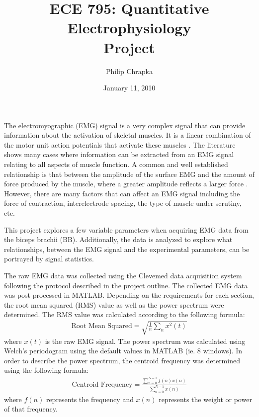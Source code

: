 \documentclass[11pt]{article}
\numberwithin{equation}{section}	%
\begin{document}
         
\title{ECE 795: Quantitative Electrophysiology\\Project}
\author{Philip Chrapka}
\date{January 11, 2010}
\maketitle

The electromyographic (EMG) signal is a very complex signal that can provide information about the activation of skeletal muscles. It is a linear combination of the motor unit action potentials that activate these muscles \cite{Beck2005,Jaskolska2006}. The literature shows many cases where information can be extracted from an EMG signal relating to all aspects of muscle function. A common and well established relationship is that between the amplitude of the surface EMG and the amount of force produced by the muscle, where a greater amplitude reflects a larger force \cite{Beck2005}. However, there are many factors that can affect an EMG signal including the force of contraction, interelectrode spacing, the type of muscle under scrutiny, etc.

This project explores a few variable parameters when acquiring EMG data from the biceps brachii (BB). Additionally, the data is analyzed to explore what relationships, between the EMG signal and the experimental parameters, can be portrayed by signal statistics.

The raw EMG data was collected using the Clevemed data acquisition system following the protocol described in the project outline. The collected EMG data was post processed in MATLAB. Depending on the requirements for each section, the root mean squared (RMS) value as well as the power spectrum were determined. The RMS value was calculated according to the following formula:
\begin{gather}
\textrm{Root Mean Squared} = \sqrt{\frac{1}{n}\sum_n{x^2(t)}} \nonumber
\end{gather}
where \(x(t)\) is the raw EMG signal. The power spectrum was calculated using Welch's periodogram using the default values in MATLAB (ie. 8 windows). In order to describe the power spectrum, the centroid frequency was determined using the following formula:
\begin{gather}
\textrm{Centroid Frequency} = \frac{\sum_{n=0}^{N-1}{f(n)x(n)}}{\sum_{n=0}^{N-1}{x(n)}} \nonumber
\end{gather}
where \(f(n)\) represents the frequency and \(x(n)\) represents the weight or power of that frequency.
\end{document}
